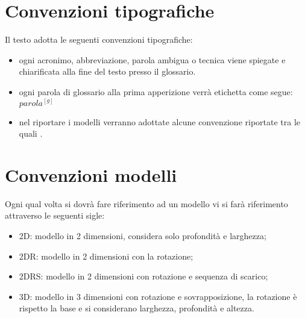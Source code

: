 \section{Convenzioni tipografiche}
Il testo adotta le seguenti convenzioni tipografiche:
\begin{itemize}
	\item ogni acronimo, abbreviazione, parola ambigua o tecnica viene spiegate e chiarificata alla fine del testo presso il glossario.
	\item ogni parola di glossario alla prima apperizione verrà etichetta come segue: $parola^{[g]}$
	\item nel riportare i modelli verranno adottate alcune convenzione riportate tra le quali   .
\end{itemize}
\section{Convenzioni modelli}
Ogni qual volta si dovrà fare riferimento ad un modello vi si farà riferimento attraverso le seguenti sigle:
\begin{itemize}
	\item 2D: modello in 2 dimensioni, considera solo profondità e larghezza;
	\item 2DR: modello in 2 dimensioni con la rotazione;
	\item 2DRS: modello in 2 dimensioni con rotazione e sequenza di scarico;
	\item 3D: modello in 3 dimensioni con rotazione e sovrapposizione, la rotazione è rispetto la base e si considerano larghezza, profondità e altezza.
\end{itemize}